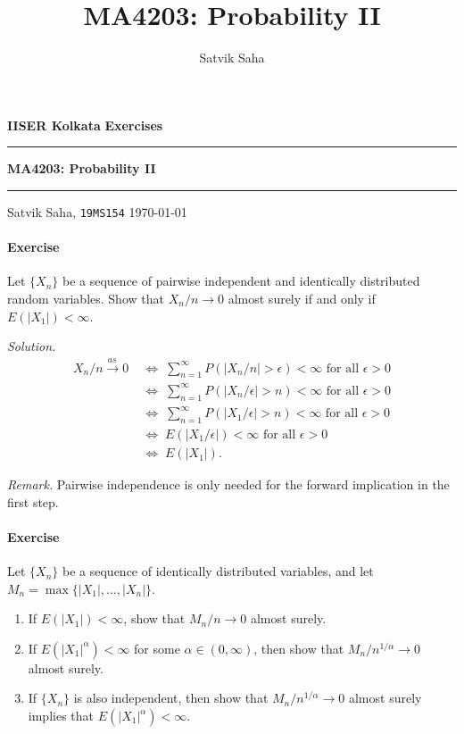 \documentclass[10pt]{article}
\title{MA4203: Probability II}
\author{Satvik Saha}
\date{}
\newcounter{prob}
\newcommand{\problem}{\stepcounter{prob}\paragraph{Exercise \arabic{prob}}}
\newcommand{\solution}{\textit{Solution.} }
\newcommand{\toas}{\overset{as\,}{\longrightarrow}}
\begin{document}
    \noindent\textbf{IISER Kolkata} \hfill \textbf{Exercises}
    \vspace{3pt}
    \hrule
    \vspace{3pt}
    \begin{center}
    \LARGE{\textbf{MA4203: Probability II}}
    \end{center}
    \vspace{3pt}
    \hrule
    \vspace{3pt}
    Satvik Saha, \texttt{19MS154} \hfill \today
    \vspace{20pt}

    \problem Let $\{X_n\}$ be a sequence of pairwise independent and identically
    distributed random variables. Show that $X_n / n \to 0$ almost surely if and only
    if $E(|X_1|) < \infty$.

    \solution \begin{align*}
        X_n/n \toas 0 \;&\iff\;
        \sum_{n = 1}^\infty P(|X_n / n| > \epsilon) < \infty \text{ for all }\epsilon
        > 0 \tag{Borel-Cantelli} \\
        \;&\iff\;
        \sum_{n = 1}^\infty P(|X_n / \epsilon| > n) < \infty \text{ for all }\epsilon
        > 0 \\
        \;&\iff\;
        \sum_{n = 1}^\infty P(|X_1 / \epsilon| > n) < \infty \text{ for all }\epsilon
        > 0 \tag{Identical distributions} \\
        \;&\iff\;
        E(|X_1 / \epsilon|) < \infty \text{ for all }\epsilon > 0 \\
        \;&\iff\;
        E(|X_1|).
    \end{align*}

    \textit{Remark.} Pairwise independence is only needed for the forward implication
    in the first step.


    \problem Let $\{X_n\}$ be a sequence of identically distributed variables, and
    let $M_n = \max\{|X_1|, \dots, |X_n|\}$.
    \begin{enumerate}
        \item If $E(|X_1|) < \infty$, show that $M_n/n \to 0$ almost surely.
        \item If $E(|X_1|^\alpha) < \infty$ for some $\alpha \in (0, \infty)$, then
        show that $M_n/n^{1/\alpha} \to 0$ almost surely.
        \item If $\{X_n\}$ is also independent, then show that $M_n/n^{1/\alpha} \to
        0$ almost surely implies that $E(|X_1|^\alpha) < \infty$.
    \end{enumerate}
\end{document}
